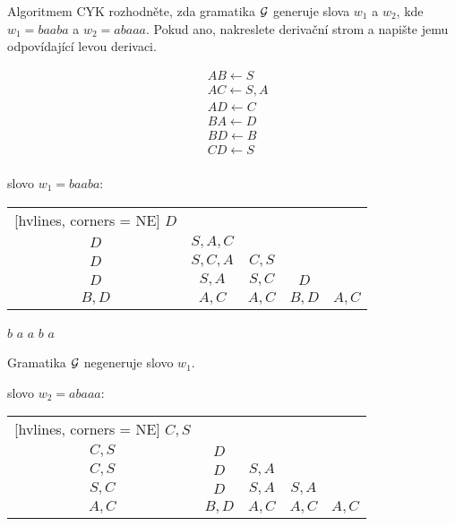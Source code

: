 Algoritmem CYK rozhodněte, zda gramatika $\mathcal{G}$ generuje slova $w_1$ a $w_2$, kde $w_1 = baaba$ a $w_2 = abaaa$.
Pokud ano, nakreslete derivační strom a napište jemu odpovídající levou derivaci.

\begin{multicols}{2}
    \begin{align*}
        & AB \leftarrow S \\
        & AC \leftarrow S, A \\
        & AD \leftarrow C \\
        & BA \leftarrow D \\
        & BD \leftarrow B \\
        & CD \leftarrow S \\
    \end{align*}

    slovo $w_1 = baaba$:

    \vspace*{2mm}

    \begin{NiceTabular}{ccccc}[hvlines, corners = NE] %
        $D$ &  &   &   &   \\
        $D$ & $S, A, C$ &  &   &   \\
        $D$ & $S, C, A$ & $C, S$ &  &  \\
        $D$ & $S, A$ & $S, C$ & $D$ &  \\
        $B, D$ & $A,C$ & $A,C$ & $B, D$ & $A, C$ \\
    \end{NiceTabular}

    \vspace*{-2mm}

    \hspace*{5mm}$b$ \hspace*{10mm} $a$ \hspace*{10mm} $a$ \hspace*{9mm} $b$ \hspace*{8mm} $a$

    \vspace*{2mm}
    Gramatika $\mathcal{G}$ negeneruje slovo $w_1$.

    slovo $w_2 = abaaa$:

    \begin{NiceTabular}{ccccc}[hvlines, corners = NE] %
        $C,S$ &   &   &   &   \\
        $C, S$ & $D$ &   &   &   \\
        $C,S$ & $D$ & $S,A$ &   &   \\
        $S,C$ & $D$ & $S,A$ & $S,A$ &   \\
        $A,C$ & $B, D$ & $A,C$ & $A,C$ & $A,C$ \\
    \end{NiceTabular}


\end{multicols}
